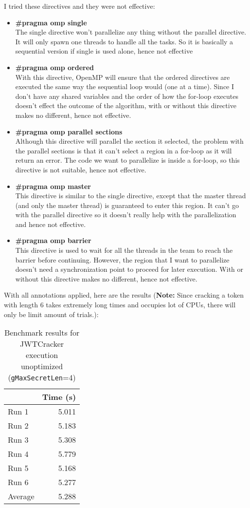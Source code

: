 \documentclass[12pt]{article}
\begin{document}
\noindent
I tried these directives and they were not effective:
\begin{itemize}
  \item \textbf{\#pragma omp single}\\
  The single directive won't parallelize any thing without the parallel directive. It will only spawn one threads to handle all the tasks. So it is basically a sequential version if single is used alone, hence not effective
  \item \textbf{\#pragma omp ordered}\\
  With this directive, OpenMP will ensure that the ordered directives are executed the same way the sequential loop would (one at a time). Since I don't have any shared variables and the order of how the for-loop executes doesn't effect the outcome of the algorithm, with or without this directive makes no different, hence not effective.
  \item \textbf{\#pragma omp parallel sections}\\
  Although this directive will parallel the section it selected, the problem with the parallel sections is that it can't select a region in a for-loop as it will return an error. The code we want to parallelize is inside a for-loop, so this directive is not suitable, hence not effective.
  \item \textbf{\#pragma omp master}\\
  This directive is similar to the single directive, except that the master thread (and only the master thread) is guaranteed to enter this region. It can't go with the parallel directive so it doesn't really help with the parallelization and hence not effective. 
  \item \textbf{\#pragma omp barrier}\\
  This directive is used to wait for all the threads in the team to reach the barrier before continuing. However, the region that I want to parallelize doesn't need a synchronization point to proceed for later execution. With or without this directive makes no different, hence not effective.
\end{itemize}

\noindent
With all annotations applied, here are the results (\textbf{Note:} Since cracking a token with length 6 takes extremely long times and occupies lot of CPUs, there will only be limit amount of trials.):

\begin{table}[H]
  \centering
  \begin{tabular}{lr}
    & {\bf Time (s)} \\
    \hline
    Run 1 & 5.011 \\
    Run 2 & 5.183 \\
    Run 3 & 5.308 \\
    Run 4 & 5.779 \\
    Run 5 & 5.168 \\
    Run 6 & 5.277 \\
    \hline
    Average & 5.288 \\
  \end{tabular}
  \caption{Benchmark results for JWTCracker execution unoptimized ({\tt gMaxSecretLen}=4)}
  \label{tbl-zeta-openmp}
\end{table}
\end{document}
